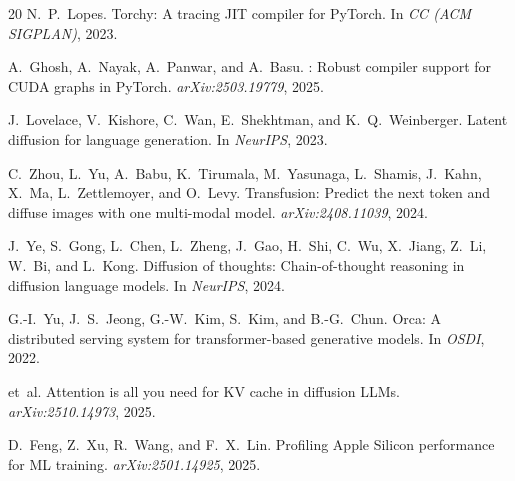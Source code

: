\documentclass[sigconf,authordraft]{acmart}
\begin{document}
\begin{thebibliography}{20}
N.~P.~Lopes.
\newblock Torchy: A tracing {JIT} compiler for {PyTorch}.
\newblock In \emph{CC (ACM SIGPLAN)}, 2023.

A.~Ghosh, A.~Nayak, A.~Panwar, and A.~Basu.
: Robust compiler support for {CUDA} graphs in {PyTorch}.
\newblock \emph{arXiv:2503.19779}, 2025.

J.~Lovelace, V.~Kishore, C.~Wan, E.~Shekhtman, and K.~Q.~Weinberger.
\newblock Latent diffusion for language generation.
\newblock In \emph{NeurIPS}, 2023.

C.~Zhou, L.~Yu, A.~Babu, K.~Tirumala, M.~Yasunaga, L.~Shamis, J.~Kahn, X.~Ma, L.~Zettlemoyer, and O.~Levy.
\newblock Transfusion: Predict the next token and diffuse images with one multi-modal model.
\newblock \emph{arXiv:2408.11039}, 2024.

J.~Ye, S.~Gong, L.~Chen, L.~Zheng, J.~Gao, H.~Shi, C.~Wu, X.~Jiang, Z.~Li, W.~Bi, and L.~Kong.
\newblock Diffusion of thoughts: Chain-of-thought reasoning in diffusion language models.
\newblock In \emph{NeurIPS}, 2024.

G.-I.~Yu, J.~S.~Jeong, G.-W.~Kim, S.~Kim, and B.-G.~Chun.
\newblock Orca: A distributed serving system for transformer-based generative models.
\newblock In \emph{OSDI}, 2022.

et~al.
\newblock Attention is all you need for {KV} cache in diffusion {LLMs}.
\newblock \emph{arXiv:2510.14973}, 2025.

D.~Feng, Z.~Xu, R.~Wang, and F.~X.~Lin.
\newblock Profiling {Apple Silicon} performance for {ML} training.
\newblock \emph{arXiv:2501.14925}, 2025.

\end{thebibliography}
\end{document}
